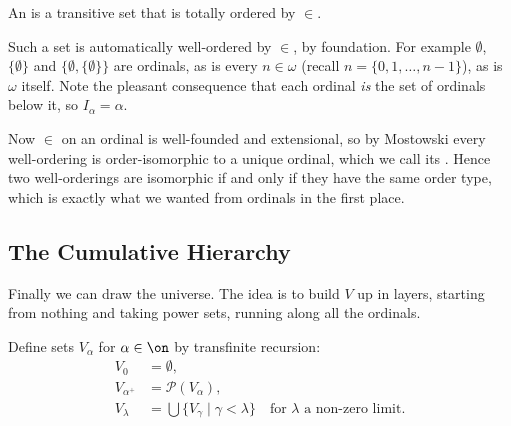 \begin{definition}[Ordinal, in ZF]
  An  is a transitive set that is totally ordered by $\in$.
\end{definition}

Such a set is automatically well-ordered by $\in$, by foundation. For example $\emptyset$, $\{\emptyset\}$ and $\{\emptyset, \{\emptyset\}\}$ are ordinals, as is every $n \in \omega$ (recall $n = \{0, 1, \dots, n-1\}$), as is $\omega$ itself. Note the pleasant consequence that each ordinal \emph{is} the set of ordinals below it, so $I_\alpha = \alpha$.

Now $\in$ on an ordinal is well-founded and extensional, so by Mostowski every well-ordering is order-isomorphic to a unique ordinal, which we call its . Hence two well-orderings are isomorphic if and only if they have the same order type, which is exactly what we wanted from ordinals in the first place.

\subsection{The Cumulative Hierarchy}

Finally we can draw the universe. The idea is to build $V$ up in layers, starting from nothing and taking power sets, running along all the ordinals.

\begin{definition}
  Define sets $V_\alpha$ for $\alpha \in \on$ by transfinite recursion:
  \begin{align*}
    V_0 &= \emptyset, \\
    V_{\alpha^+} &= \mathcal{P}(V_\alpha), \\
    V_\lambda &= \bigcup \{V_\gamma \mid \gamma < \lambda\} \quad \text{for } \lambda \text{ a non-zero limit.}
  \end{align*}
\end{definition}

\begin{center}
\end{center}

